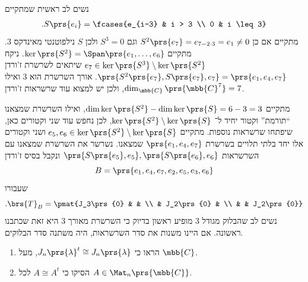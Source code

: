 \documentclass[a4paper,10pt,twoside,openany]{book}
\begin{document}
\begin{solution}
נשים לב ראשית שמתקיים
\begin{align*}
\text{.} S\prs{e_i} = \fcases{e_{i-3} & i > 3 \\
0 & i \leq 3}
\end{align*}
מתקיים אם כן
$S^2\prs{e_7} = e_{7-2 \cdot 3} = e_1 \neq 0$
וגם
$S^3 = 0$
ולכן
$S$
נילפוטנטי מאינדקס
$3$.
מתקיים
$\ker\prs{S^2} = \Span\prs{e_1, \ldots, e_6}$.
ניקח
$e_7 \in \ker\prs{S^3} \setminus \ker\prs{S^2}$
שיתאים לשרשרת ז'ורדן
$\prs{S^2\prs{e_7}, S\prs{e_7}, e_7} = \prs{e_1, e_4, e_7}$.
אורך השרשרת הוא
$3$
ואילו
$\dim_{\mbb{C}}\prs{\mbb{C}^7} = 7$,
ולכן יש למצוא עוד שרשראות ז'ורדן.

מתקיים
$\dim \ker\prs{S^2} - \dim \ker\prs{S} = 6-3 = 3$,
ואילו השרשרת שמצאנו ``תורמת'' וקטור יחיד ל־%
$\ker\prs{S^2} \setminus \ker\prs{S}$,
לכן נחפש עוד שני וקטורים כאן, שיפתחו שרשראות נוספות.
מתקיים
$e_5, e_6 \in \ker\prs{S^2} \setminus \ker\prs{S}$
ושני וקטורים אלו יחד בלתי תלויים בשרשרת
$\prs{e_1, e_4, e_7}$
שמצאנו. נשרשר את השרשרת שמצאנו עם השרשראות
$\prs{S\prs{e_5}, e_5}, \prs{S\prs{e_6},e_6}$
ונקבל בסיס ז'ורדן
\[B = \prs{e_1, e_4, e_7, e_2, e_5, e_3, e_6}\]
שעבורו
\[\text{.} \brs{T}_B = \pmat{J_3\prs{0} & & \\ & J_2\prs{0} & \\ & & J_2\prs{0}}\]
נשים לב שהבלוק מגודל
$3$
מופיע ראשון בדיוק כי השרשרת מאורך
$3$
היא זאת שכתבנו ראשונה. אם היינו משנות את סדר השרשראות, היה משתנה סדר הבלוקים.
\end{solution}

\begin{exercisechap}
\begin{enumerate}
\item הראו כי
$J_n\prs{\lambda}^t \cong J_n\prs{\lambda}$,
מעל
$\mbb{C}$.
\item הסיקו כי
$A \cong A^t$
לכל
$A \in \Mat_n\prs{\mbb{C}}$.
\end{enumerate}
\end{exercisechap}
\end{document}
